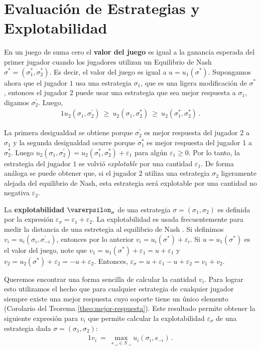 \chapter{Evaluación de Estrategias y Explotabilidad}
\label{section:explotabilidad}

En un juego de suma cero el \textbf{valor del juego} es igual a la ganancia esperada del primer jugador cuando los jugadores utilizan un Equilibrio de Nash $\sigma^* = (\sigma^*_1, \sigma^*_2)$. Es decir, el valor del juego es igual a $u = u_1(\sigma^*)$. Supongamos ahora que el jugador $1$  usa una estrategia $\sigma_1$, que es una ligera modificación de $\sigma^*$, entonces el jugador $2$ puede usar una estrategia que sea mejor respuesta a $\sigma_1$, digamos $\sigma^{\prime}_2$. Luego,
\begin{alignat}{1}
u_2(\sigma_1, \sigma^{\prime}_2)\ \geq\ u_2(\sigma_1, \sigma^*_2)\ \geq\ u_2(\sigma^*_1, \sigma^*_2) \,.
\end{alignat}

La primera desigualdad se obtiene porque $\sigma^{\prime}_2$ es mejor respuesta del jugador 2 a $\sigma_1$ y la segunda desigualdad ocurre porque $\sigma^*_1$ es mejor respuesta del jugador 1 a $\sigma^*_2$. Luego $u_2(\sigma_1, \sigma^{\prime}_2) = u_2(\sigma^*_1, \sigma^*_2) + \varepsilon_1$ para algún $\varepsilon_1 \geq 0$. Por lo tanto, la estrategia del jugador $1$ se volvió \textit{explotable} por una cantidad $\varepsilon_1$. De forma análoga se puede obtener que, si el jugador $2$ utiliza una estrategia $\sigma_2$ ligeramente alejada del equilibrio de Nash, esta estrategia será explotable por una cantidad no negativa $\varepsilon_2$.

La \textbf{explotabilidad} $\varerpsilon_\sigma$ de una estrategia $\sigma = (\sigma_1, \sigma_2)$ es definida por la expresión $\varepsilon_{\sigma} = \varepsilon_1 + \varepsilon_2$. La explotabilidad es usada frecuentemente para medir la distancia de una estretegia al equilibrio de Nash \cite[p. 7]{bib:thesis-marc-lanctot}. Si definimos $v_i = u_i(\sigma_i, \sigma^{\prime}_{-i})$, entonces por lo anterior $v_i = u_i(\sigma^*) + \varepsilon_i$. Si $u=u_1(\sigma^*)$ es el valor del juego, note que $v_1 = u_1(\sigma^*) + \varepsilon_1 = u + \varepsilon_1$ y $v_2 = u_2(\sigma^*) + \varepsilon_2 = -u + \varepsilon_2$. Entonces,  $\varepsilon_{\sigma} = u + \varepsilon_1 - u + \varepsilon_2 =  v_1 + v_2$.

Queremos encontrar una forma sencilla de calcular la cantidad $v_i$. Para lograr esto utilizamos el hecho que para cualquier estrategia de cualquier jugador siempre existe una mejor respuesta cuyo soporte tiene un único elemento (Corolario del Teorema \ref{theo:mejor-respuesta}). Este resultado permite obtener la siguiente expresión para $v_i$ que permite calcular la explotabilidad $\varepsilon_\sigma$ de una estrategia dada $\sigma=(\sigma_1,\sigma_2)$:
\begin{alignat}{1}
v_i\ =\ \max_{s_{-i} \in S_{-i}} u_i(\sigma_i, s_{-i}) \,.
\end{alignat}

